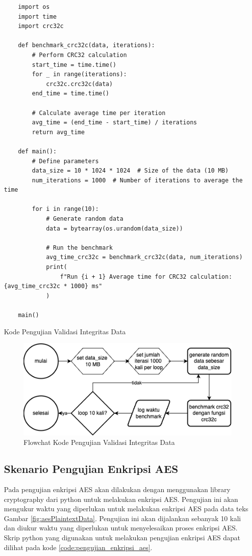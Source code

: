 \begin{listing}[H]
    \begin{verbatim}
    import os
    import time
    import crc32c

    def benchmark_crc32c(data, iterations):
        # Perform CRC32 calculation
        start_time = time.time()
        for _ in range(iterations):
            crc32c.crc32c(data)
        end_time = time.time()

        # Calculate average time per iteration
        avg_time = (end_time - start_time) / iterations
        return avg_time

    def main():
        # Define parameters
        data_size = 10 * 1024 * 1024  # Size of the data (10 MB)
        num_iterations = 1000  # Number of iterations to average the time

        for i in range(10):
            # Generate random data
            data = bytearray(os.urandom(data_size))

            # Run the benchmark
            avg_time_crc32c = benchmark_crc32c(data, num_iterations)
            print(
                f"Run {i + 1} Average time for CRC32 calculation: {avg_time_crc32c * 1000} ms"
            )

    main()
    \end{verbatim}
    \caption{Kode Pengujian Validasi Integritas Data}
    \label{code:kode_pengujian_validasi_integritas_data}
\end{listing}

\begin{figure}
    \centering
    \includegraphics[width=1\textwidth]
    {assets/pics/code-flowchart/flowchart_crc32.png}
    \caption{Flowchat Kode Pengujian Validasi Integritas Data}
    \label{fig:flowchart_crc32}
\end{figure}

\subsection{Skenario Pengujian Enkripsi AES}
Pada pengujian enkripsi AES akan dilakukan dengan menggunakan library cryptography dari python untuk melakukan enkripsi AES. Pengujian ini akan mengukur waktu yang diperlukan untuk melakukan enkripsi AES pada data teks Gambar \ref{fig:aesPlaintextData}. Pengujian ini akan dijalankan sebanyak 10 kali dan diukur waktu yang diperlukan untuk menyelesaikan proses enkripsi AES. Skrip python yang digunakan untuk melakukan pengujian enkripsi AES dapat dilihat pada kode \ref{code:pengujian_enkripsi_aes}.

